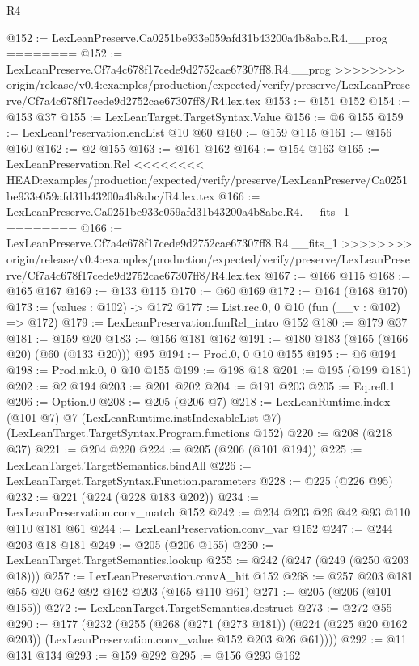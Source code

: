 \begin{lexlean}{R4}
\begin{coremodule}
{{{{{{{{@152 := LexLeanPreserve.Ca0251be933e059afd31b43200a4b8abc.R4.__prog
========
@152 := LexLeanPreserve.Cf7a4c678f17cede9d2752cae67307ff8.R4.__prog
>>>>>>>> origin/release/v0.4:examples/production/expected/verify/preserve/LexLeanPreserve/Cf7a4c678f17cede9d2752cae67307ff8/R4.lex.tex
@153 := @151 @152
@154 := @153 @37
@155 := LexLeanTarget.TargetSyntax.Value
@156 := @6 @155
@159 := LexLeanPreservation.encList @10 @60
@160 := @159 @115
@161 := @156 @160
@162 := @2 @155
@163 := @161 @162
@164 := @154 @163
@165 := LexLeanPreservation.Rel
<<<<<<<< HEAD:examples/production/expected/verify/preserve/LexLeanPreserve/Ca0251be933e059afd31b43200a4b8abc/R4.lex.tex
@166 := LexLeanPreserve.Ca0251be933e059afd31b43200a4b8abc.R4.__fits_1
========
@166 := LexLeanPreserve.Cf7a4c678f17cede9d2752cae67307ff8.R4.__fits_1
>>>>>>>> origin/release/v0.4:examples/production/expected/verify/preserve/LexLeanPreserve/Cf7a4c678f17cede9d2752cae67307ff8/R4.lex.tex
@167 := @166 @115
@168 := @165 @167
@169 := @133 @115
@170 := @60 @169
@172 := @164 (@168 @170)
@173 := (values : @102) -> @172
@177 := List.rec.{0, 0} @10 (fun (__v : @102) => @172)
@179 := LexLeanPreservation.funRel_intro @152
@180 := @179 @37
@181 := @159 @20
@183 := @156 @181 @162
@191 := @180 @183 (@165 (@166 @20) (@60 (@133 @20))) @95
@194 := Prod.{0, 0} @10 @155
@195 := @6 @194
@198 := Prod.mk.{0, 0} @10 @155
@199 := @198 @18
@201 := @195 (@199 @181)
@202 := @2 @194
@203 := @201 @202
@204 := @191 @203
@205 := Eq.refl.{1}
@206 := Option.{0}
@208 := @205 (@206 @7)
@218 := LexLeanRuntime.index
    (@101 @7)
    @7
    (LexLeanRuntime.instIndexableList @7)
    (LexLeanTarget.TargetSyntax.Program.functions @152)
@220 := @208 (@218 @37)
@221 := @204 @220
@224 := @205 (@206 (@101 @194))
@225 := LexLeanTarget.TargetSemantics.bindAll
@226 := LexLeanTarget.TargetSyntax.Function.parameters
@228 := @225 (@226 @95)
@232 := @221 (@224 (@228 @183 @202))
@234 := LexLeanPreservation.conv_match @152
@242 := @234 @203 @26 @42 @93 @110 @110 @181 @61
@244 := LexLeanPreservation.conv_var @152
@247 := @244 @203 @18 @181
@249 := @205 (@206 @155)
@250 := LexLeanTarget.TargetSemantics.lookup
@255 := @242 (@247 (@249 (@250 @203 @18)))
@257 := LexLeanPreservation.convA_hit @152
@268 := @257 @203 @181 @55 @20 @62 @92 @162 @203 (@165 @110 @61)
@271 := @205 (@206 (@101 @155))
@272 := LexLeanTarget.TargetSemantics.destruct
@273 := @272 @55
@290 := @177
    (@232
      (@255
        (@268
          (@271 (@273 @181))
          (@224 (@225 @20 @162 @203))
          (LexLeanPreservation.conv_value @152 @203 @26 @61))))
@292 := @11 @131 @134
@293 := @159 @292
@295 := @156 @293 @162
}}}}}}}}
\end{coremodule}
\end{lexlean}
